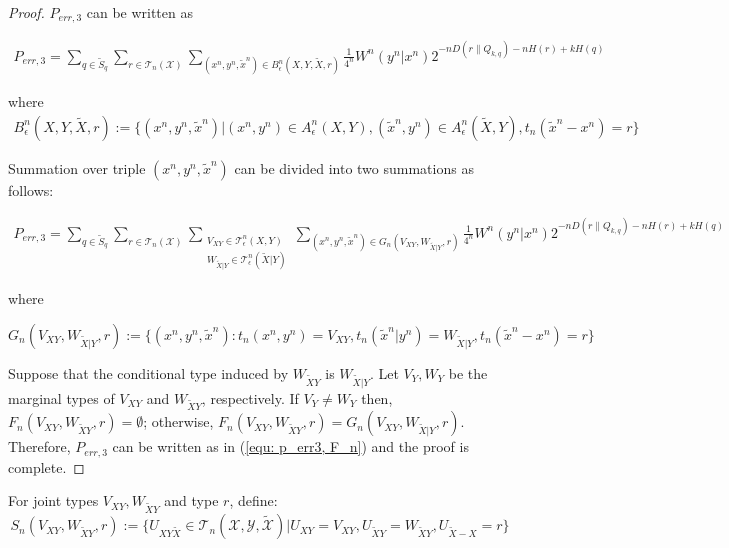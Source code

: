 \begin{proof}
$P_{err,3}$ can be written as

\begin{align*}
P_{err,3}=\sum_{q\in \tilde{S}_q}\sum_{r\in\mathcal{T}_n(\mathcal{X}) } \sum_{(x^n,y^n,\tilde{x}^n)\in B_\epsilon^n(X,Y,\tilde{X},r)}  \frac{1}{4^n} W^n(y^n|x^n)2^{-nD(r\| Q_{k,q})-nH(r)+kH(q)}
\end{align*}

where
\begin{align*}
B_\epsilon^n(X,Y,\tilde{X},r):=\{ (x^n,y^n,\tilde{x}^n)| (x^n,y^n)\in A_\epsilon^n(X,Y),(\tilde{x}^n,y^n)\in A_\epsilon^n(\tilde{X},Y),  t_n(\tilde{x}^n-x^n)=r \}
\end{align*}



 Summation over triple $(x^n,y^n,\tilde{x}^n)$ can be divided into two summations as follows:

\begin{align*}
P_{err,3}=\sum_{q\in \tilde{S}_q}\sum_{r\in\mathcal{T}_n(\mathcal{X}) } \sum_{\substack{V_{XY}\in \mathcal{T}_\epsilon^n(X,Y)\\ W_{\tilde{X}|Y}\in  \mathcal{T}_\epsilon^n(\tilde{X}|Y) }} \sum_{(x^n,y^n,\tilde{x}^n)\in G_n(V_{XY},W_{\tilde{X}|Y},r)}  \frac{1}{4^n} W^n(y^n|x^n)2^{-nD(r\| Q_{k,q})-nH(r)+kH(q)}
\end{align*}

where

\begin{equation*}
G_n(V_{XY},W_{\tilde{X}|Y},r):=\{(x^n,y^n,\tilde{x}^n): t_n(x^n,y^n)=V_{XY}, t_n(\tilde{x}^n|y^n)=W_{\tilde{X}|Y}, t_n(\tilde{x}^n-x^n)=r \}
\end{equation*}

Suppose that the conditional type induced by $W_{\tilde{X}Y}$ is $W_{\tilde{X}|Y}$. Let $V_Y, W_Y$ be the marginal types of $V_{XY}$ and $W_{\tilde{X}Y}$, respectively. If $V_Y \neq W_Y$ then, $F_n(V_{XY},W_{\tilde{X}Y},r)=\emptyset$; otherwise, $F_n(V_{XY},W_{\tilde{X}Y},r)=G_n(V_{XY},W_{\tilde{X}|Y},r)$. Therefore, $P_{err,3}$ can be written as in (\ref{equ: p_err3, F_n}) and the proof is complete.
\end{proof}


For joint types $V_{XY},W_{\tilde{X}Y}$ and type $r$, define:
\begin{equation*}
S_n(V_{XY},W_{\tilde{X}Y},r):=\{ U_{XY\tilde{X}} \in \mathcal{T}_n(\mathcal{X},\mathcal{Y},\tilde{\mathcal{X}})| U_{XY}=V_{XY}, U_{\tilde{X}Y}=W_{\tilde{X}Y}, U_{\tilde{X}-X}=r\}
\end{equation*}

